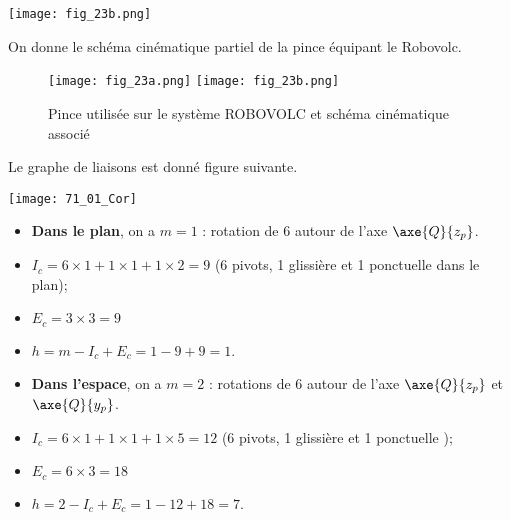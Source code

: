 \normaltrue \difficilefalse \tdifficilefalse
\correctiontrue

\setcounter{question}{0}%


\ifcorrection
\else
{}
\fi

\ifprof
\begin{marginfigure}
\centering
\texttt{[image: fig\_23b.png]}
\end{marginfigure} 

\else

On donne le schéma cinématique partiel de la pince équipant le Robovolc.
\begin{figure}[H]
\centering
\texttt{[image: fig\_23a.png]}
\texttt{[image: fig\_23b.png]}
\caption{Pince utilisée sur le système ROBOVOLC et schéma cinématique associé \label{fig_23}}
\end{figure} 
\fi 


\ifprof

Le graphe de liaisons est donné figure suivante. 

\begin{center}
\texttt{[image: 71\_01\_Cor]}
\end{center}

\begin{itemize}
\item \textbf{Dans le plan}, on a $m=1$ : rotation de 6 autour de l'axe $\axe{Q}{z_p}$.
\item $I_c = 6\times 1 + 1 \times 1 + 1 \times 2 = 9$ (6 pivots, 1 glissière et 1 ponctuelle dans le plan);
\item $E_c = 3 \times 3 = 9$
\item $h=m-I_c+E_c = 1-9+9 = 1$. 
\end{itemize}
\begin{itemize}
\item \textbf{Dans l'espace}, on a $m=2$ : rotations de 6 autour de l'axe $\axe{Q}{z_p}$ et $\axe{Q}{y_p}$.
\item $I_c = 6\times 1 + 1 \times 1 + 1 \times 5 = 12$ (6 pivots, 1 glissière et 1 ponctuelle );
\item $E_c = 6 \times 3 = 18$
\item $h=2-I_c+E_c = 1-12+18 = 7$. 
\end{itemize}
\else
\fi


\ifprof
\else
\ifcolle
\else
{}
 \fi

\fi